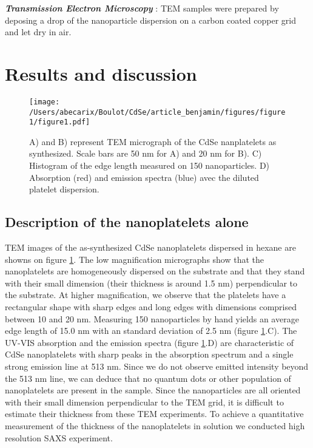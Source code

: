 \documentclass[journal = jacsat, manuscript=article, layout = twocolumn]{achemso}
\begin{document}
\textbf{\textit{Transmission Electron Microscopy}} : TEM samples were prepared by deposing a drop of the nanoparticle dispersion on a carbon coated copper grid and let dry in air. 																					

\section{Results and discussion}
\begin{figure}	
\texttt{[image: /Users/abecarix/Boulot/CdSe/article\_benjamin/figures/figure1/figure1.pdf]}
\caption{\label{TEM_UV} A) and B) represent TEM micrograph of the CdSe nanplatelets as synthesized. Scale bars are 50 nm for A) and 20 nm for B). C) Histogram of the edge length measured on 150 nanoparticles. D) Absorption (red) and emission spectra (blue) avec the diluted platelet dispersion.}
\end{figure}

\subsection{Description of the nanoplatelets alone}
TEM images of the as-synthesized CdSe nanoplatelets dispersed in hexane are showns on figure \ref{TEM_UV}. The low magnification micrographs show that the nanoplatelets are homogeneously dispersed on the substrate and that they stand with their small dimension (their thickness is around 1.5 nm) perpendicular to the substrate. At higher magnification, we observe that the platelets have a rectangular shape with sharp edges and long edges with dimensions comprised between 10 and 20 nm. Measuring 150 nanoparticles by hand yields an average edge length of 15.0 nm with an standard deviation of 2.5 nm (figure \ref{TEM_UV}.C). The UV-VIS absorption and the emission spectra (figure \ref{TEM_UV}.D) are characteristic of CdSe nanoplatelets \cite{Ithurria:2011jt} with sharp peaks in the absorption spectrum  and a single strong emission line at 513 nm. Since we do not observe emitted intensity beyond the 513 nm line, we can deduce that no quantum dots or other population of nanoplatelets are present in the sample. Since the nanoparticles are all oriented with their small dimension perpendicular to the TEM grid, it is difficult to estimate their thickness from these TEM experiments. To achieve a quantitative measurement of the thickness of the nanoplatelets in solution we conducted high resolution SAXS experiment. \\
\end{document}
